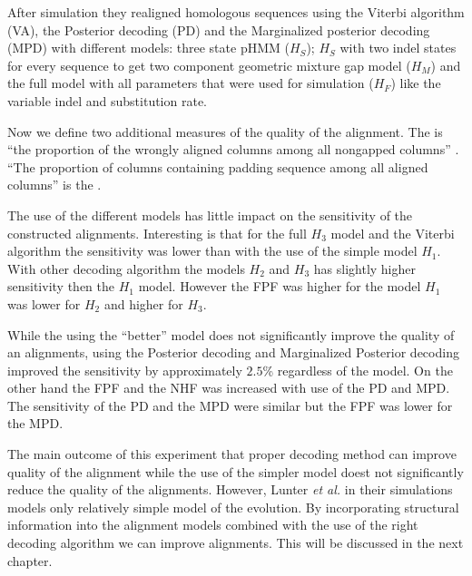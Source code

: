 After simulation they realigned homologous sequences using the Viterbi algorithm
(VA), the Posterior decoding (PD) and the Marginalized posterior decoding (MPD)
with different models: three state pHMM ($H_S$); $H_S$ with two indel states for
every sequence to get two component geometric mixture gap model ($H_M$) and the
full model with all parameters that were used for simulation ($H_F$) like the
variable indel and substitution rate. 

Now we define two additional measures of the quality of the alignment. The
 is ``the proportion of the wrongly
aligned columns among all nongapped columns'' \cite{Lunter2008}. ``The
proportion of columns containing padding sequence among all aligned columns'' is
the .


The use of the different models has little impact on the sensitivity of the
constructed alignments. Interesting is that for the full $H_3$ model and the
Viterbi algorithm the sensitivity was lower than with the use of the simple
model $H_1$. With other decoding algorithm the models $H_2$ and $H_3$ has
slightly higher sensitivity then the $H_1$ model. However the FPF  was higher
for the model $H_1$ was lower for $H_2$ and higher for $H_3$.

While the using the ``better'' model does not significantly improve the quality
of an alignments, using the Posterior decoding and Marginalized Posterior
decoding improved the sensitivity by approximately $2.5$\% regardless of the
model. On the other hand the FPF and the NHF was increased with use of the PD
and MPD. The sensitivity of the PD and the MPD were similar but the FPF was
lower for the MPD. 

The main outcome of this experiment that proper decoding method can improve
quality of the alignment while the use of the simpler model doest not
significantly reduce the quality of the alignments. However, Lunter {\it et al.}
in their simulations models only relatively simple model of the evolution. By
incorporating structural information into the alignment models combined with the
use of the right decoding algorithm we can improve alignments.  This will be
discussed in the next chapter. 


